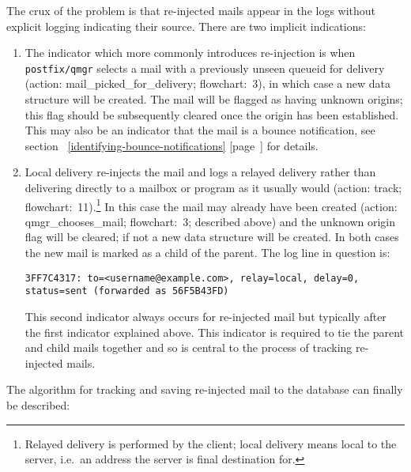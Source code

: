 \documentclass[a4paper,12pt,draft]{article}
\newcommand{\refwithpage}[1]{%
    \empty{}\ref{#1} [page~\pageref{#1}]%
}
\begin{document}
The crux of the problem is that re-injected mails appear in the logs
without explicit logging indicating their source.  There are two implicit
indications:

\begin{enumerate}

    \item The indicator which more commonly introduces re-injection is when
        \texttt{postfix/qmgr} selects a mail with a previously unseen
        queueid for delivery (action: mail\_picked\_for\_delivery;
        flowchart:~3), in which case a new data structure will be created.
        The mail will be flagged as having unknown origins; this flag
        should be subsequently cleared once the origin has been
        established.  This may also be an indicator that the mail is a
        bounce notification, see
        section~\refwithpage{identifying-bounce-notifications} for details.

    \item Local delivery re-injects the mail and logs a relayed delivery
        rather than delivering directly to a mailbox or program as it
        usually would (action: track; flowchart:~11).\footnote{Relayed
        delivery is performed by the \SMTP{} client; local delivery means
        local to the server, i.e.\ an address the server is final
        destination for.} In this case the mail may already have been
        created (action: qmgr\_chooses\_mail; flowchart:~3; described
        above) and the unknown origin flag will be cleared; if not a new
        data structure will be created.  In both cases the new mail is
        marked as a child of the parent.  The log line in question is:

        \texttt{3FF7C4317: to=<username@example.com>, relay=local, \newline 
        delay=0, status=sent (forwarded as 56F5B43FD)}

        This second indicator always occurs for re-injected mail but
        typically after the first indicator explained above.  This
        indicator is required to tie the parent and child mails together
        and so is central to the process of tracking re-injected mails.

\end{enumerate}

The algorithm for tracking and saving re-injected mail to the database can
finally be described:
\end{document}
